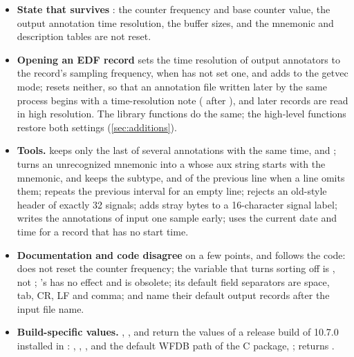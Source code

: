 \begin{itemize}
  another at time 0 counts as in order, so that annotations written twice at
  a time-0 location are not sorted, and both are kept.
\item \textbf{State that survives }: the counter frequency
  and base counter value, the output annotation time resolution, the buffer
  sizes, and the mnemonic and description tables are not reset.
\item \textbf{Opening an EDF record} sets the time resolution of output
  annotators to the record's sampling frequency, when  has not
  set one, and adds  to the getvec mode; 
  resets neither, so that an annotation file written later by the same
  process begins with a time-resolution note ( after ), and later records are read in high
  resolution. The library functions do the same; the high-level functions
  restore both settings (\cref{sec:additions}).
\item \textbf{Tools.}  keeps only the last of several
  annotations with the same time,  and ; 
  turns an unrecognized mnemonic into a  whose aux string starts
  with the mnemonic, and keeps the subtype,  and  of the
  previous line when a line omits them;  repeats the previous
  interval for an empty line;  rejects an old-style header of
  exactly 32 signals;  adds stray bytes to a 16-character signal
  label;  writes the annotations of  input one
  sample early;  uses the current date and time for a record
  that has no start time.
\item \textbf{Documentation and code disagree} on a few points, and \wfdbx{}
  follows the code:  does not reset the counter frequency;
  the variable that turns sorting off is , not
  ; 's  has no effect and  is
  obsolete; its default field separators are space, tab, CR, LF and comma;
   and  name their default output records after
  the input file name.
\item \textbf{Build-specific values.} , ,
   and  return the values of a release
  build of 10.7.0 installed in : ,
  , , and the default WFDB path of the C package,
  ;
   returns .
\end{itemize}

